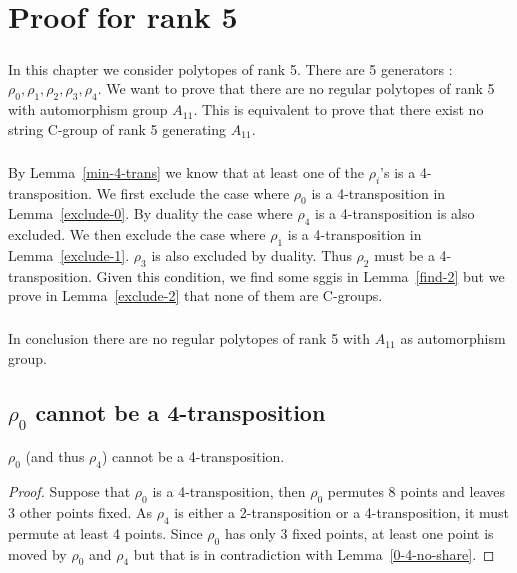 \chapter{Proof for rank 5}

\paragraph{}
In this chapter we consider polytopes of rank 5. There are 5 generators : $\rho_0, \rho_1, \rho_2, \rho_3, \rho_4$. We want to prove that there are no regular polytopes of rank 5 with automorphism group $A_{11}$. This is equivalent to prove that there exist no string C-group of rank 5 generating $A_{11}$.

\paragraph{}
By Lemma~\ref{min-4-trans} we know that at least one of the $\rho_i$'s is a 4-transposition. We first exclude the case where $\rho_0$ is a 4-transposition in Lemma~\ref{exclude-0}. By duality the case where $\rho_4$ is a 4-transposition is also excluded. We then exclude the case where $\rho_1$ is a 4-transposition in Lemma~\ref{exclude-1}. $\rho_3$ is also excluded by duality. Thus $\rho_2$ must be a 4-transposition. Given this condition, we find some sggis in Lemma~\ref{find-2} but we prove in Lemma~\ref{exclude-2} that none of them are C-groups.

\paragraph{}
In conclusion there are no regular polytopes of rank 5 with $A_{11}$ as automorphism group.

\section{$\rho_0$ cannot be a 4-transposition}

\begin{lemma}
  \label{exclude-0}
  $\rho_0$ (and thus $\rho_4$) cannot be a 4-transposition.
\end{lemma}

\begin{proof}
  Suppose that $\rho_0$ is a 4-transposition, then $\rho_0$ permutes 8 points and leaves 3 other points fixed. As $\rho_4$ is either a 2-transposition or a 4-transposition, it must permute at least 4 points. Since $\rho_0$ has only 3 fixed points, at least one point is moved by $\rho_0$ and $\rho_4$ but that is in contradiction with Lemma~\ref{0-4-no-share}.
\end{proof}
